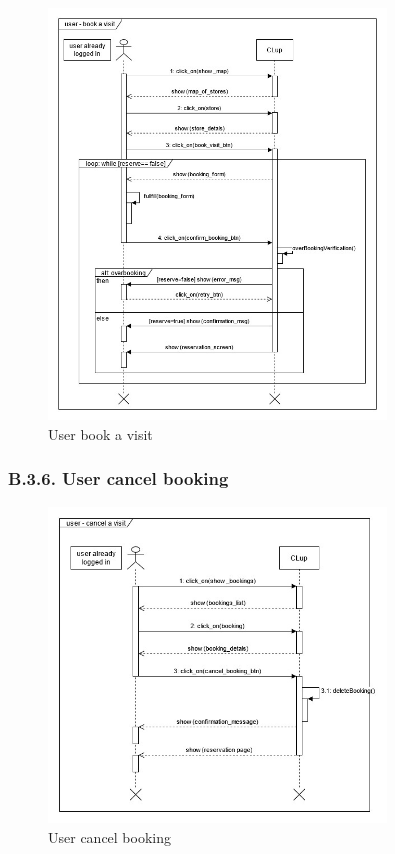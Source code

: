 \begin{figure}[H]
\centering
\includegraphics[width=0.8\textwidth]{sequence_diagrams/sequence_diagram_user_booking}
\caption{User book a visit}
\end{figure}

\subsubsection{B.3.6. User cancel booking}

\begin{figure}[H]
\centering
\includegraphics[width=0.8\textwidth]{sequence_diagrams/sequence_diagram_user_cancel_booking}
\caption{User cancel booking}
\end{figure}

